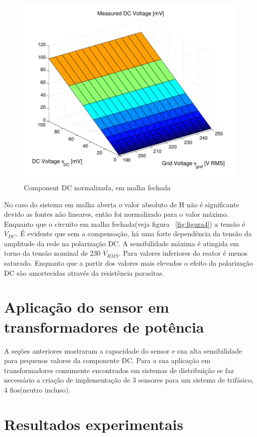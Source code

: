 \documentclass[paper=a4, fontsize=11pt]{article}
\begin{document}
\begin{figure}[!ht]
	\centering
	\includegraphics[scale=.8]{fig8.png}
    \caption{Component DC normalizada, em malha fechada}
    \label{fig:figura8}
\end{figure}

No caso do sistema em malha aberta o valor absoluto de H não é significante devido
as fontes não lineares, então foi normalizado para o valor máximo. Enquanto que
o circuito em malha fechada(veja figura ~\ref{fig:figura4}) a tensão é $V_{DC}$.
É evidente que sem a compensação, há uma forte dependência da tensão da 
amplitude da rede na polarização DC. A sensibilidade máxima é atingida
em torno da tensão nominal de 230 $V_{RMS}$. Para valores inferiores 
do reator é menos saturado. Enquanto que a partir dos valores mais elevados
o efeito da polarização DC são amortecidas através da resistência parasitas.

\section{Aplicação do sensor em transformadores de potência}

A seções anteriores mostraram a capacidade do sensor e sua alta sensibilidade
para pequenos valores da componente DC. Para a sua aplicação em transformadores
comumente encontrados em sistemas de distribuição se faz necessário a criação
de implementação de 3 sensores para um sistema de trifásico, 4 fios(neutro incluso).

\section{Resultados experimentais}
\end{document}
